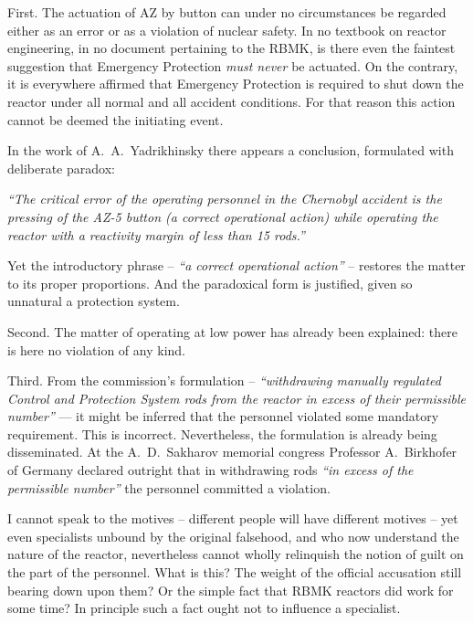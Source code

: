 \documentclass[openright]{bookest}
\begin{document}
First. The actuation of AZ by button can under no circumstances be regarded either as an error or as a violation of nuclear safety. In no textbook on reactor engineering, in no document pertaining to the RBMK, is there even the faintest suggestion that Emergency Protection \textit{must never} be actuated. On the contrary, it is everywhere affirmed that Emergency Protection is required to shut down the reactor under all normal and all accident conditions. For that reason this action cannot be deemed the initiating event.

In the work of A.~A.~Yadrikhinsky there appears a conclusion, formulated with deliberate paradox:

\begin{personal}
\textit{``The critical error of the operating personnel in the Chernobyl accident is the pressing of the AZ-5 button (a correct operational action) while operating the reactor with a reactivity margin of less than \num{15} rods.''}
\end{personal}

Yet the introductory phrase -- \textit{``a correct operational action''} -- restores the matter to its proper proportions. And the paradoxical form is justified, given so unnatural a protection system.

Second. The matter of operating at low power has already been explained: there is here no violation of any kind.

Third. From the commission's formulation -- \textit{``withdrawing manually regulated Control and Protection System rods from the reactor in excess of their permissible number''} --- it might be inferred that the personnel violated some mandatory requirement. This is incorrect. Nevertheless, the formulation is already being disseminated. At the A.~D.~Sakharov memorial congress Professor A.~Birkhofer of Germany declared outright that in withdrawing rods \textit{``in excess of the permissible number''} the personnel committed a violation.

I cannot speak to the motives -- different people will have different motives -- yet even specialists unbound by the original falsehood, and who now understand the nature of the reactor, nevertheless cannot wholly relinquish the notion of guilt on the part of the personnel. What is this? The weight of the official accusation still bearing down upon them? Or the simple fact that RBMK reactors did work for some time? In principle such a fact ought not to influence a specialist.
\end{document}
